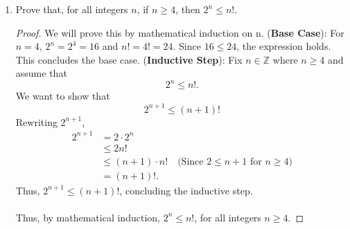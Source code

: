 \documentclass{article}
\begin{document}
\begin{enumerate}
    	\item Prove that, for all integers $n$, if $n \ge 4$, then $2^n \le n!$.
                \begin{proof}
                    We will prove this by mathematical induction on n.
                    \ppar (\textbf{Base Case}): For $n = 4$, $2^n = 2^4 = 16$ and $n! = 4! = 24$. Since $16 \le 24$, the expression holds. This concludes the base case.
                    \ppar (\textbf{Inductive Step}): Fix $n\in\mathbb{Z}$ where $n \ge 4$ and assume that
                        \[
    			             2^n \le n!.
    		          \]
                    \ppar We want to show that
                        \[
    			             2^{n + 1} \le (n + 1)!
    		          \]
                    \ppar Rewriting $2^{n + 1}$, 
                        \begin{align*}
                            2^{n + 1} &= 2 \cdot 2^n \\ 
                            &\le 2n! \\
                            &\le (n + 1)\cdot n! \quad\text{(Since $2 \le n + 1$ for $n \ge 4$)}\\
                            &= (n + 1)!.
                        \end{align*}
                    \ppar Thus, $2^{n + 1} \le (n + 1)!$, concluding the inductive step.
                    \\\\ Thus, by mathematical induction, $2^n \le n!$, for all integers $n \ge 4$.
                \end{proof}


\end{enumerate}
\end{document}
